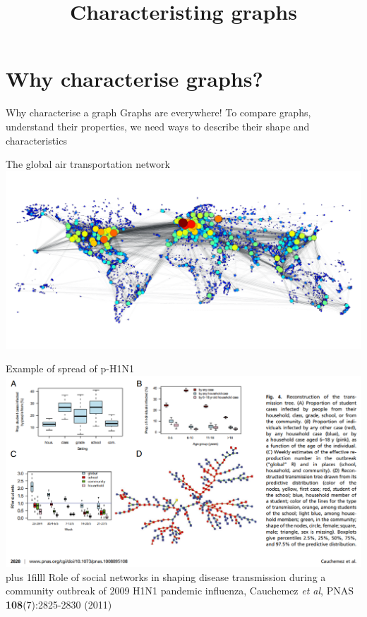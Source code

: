 \documentclass[aspectratio=169]{beamer}\usepackage[]{graphicx}\usepackage[]{xcolor}
\title{Characteristing graphs}
\date{}
\begin{document}
\begin{frame}
	\titlepage
\end{frame}


\section{Why characterise graphs?}
\begin{frame}{Why characterise a graph}
Graphs are everywhere!
\vfill
To compare graphs, understand their properties, we need ways to describe their shape and characteristics
\end{frame}

\begin{frame}{The global air transportation network}
	\bigskip
	{\centering
		\hspace*{-\beamerleftmargin}
		\includegraphics[width=\paperwidth]{FIGS_slides/world_graph-degree}
	}
\end{frame}

\begin{frame}{Example of spread of p-H1N1}
	\bigskip
	{\centering
		\hspace*{-\beamerleftmargin}
		\includegraphics[width=\paperwidth]{FIGS_slides/Cauchemez_etal_H1N1}
	}
	\vskip0pt plus 1filll
	\tiny
	Role of social networks in shaping disease transmission during a community outbreak of 2009 H1N1 pandemic influenza, Cauchemez \emph{et al}, PNAS \textbf{108}(7):2825-2830 (2011)
\end{frame}
\end{document}
